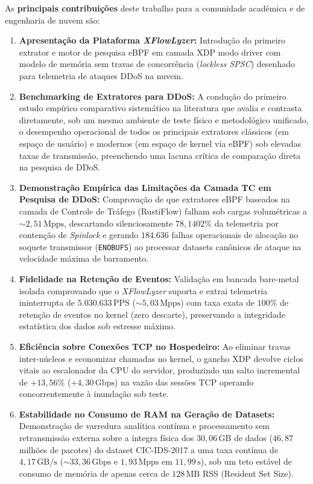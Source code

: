 \documentclass[conference]{IEEEtran}
\newcommand{\nome}{\textit{XFlowLyzer}\xspace}
\begin{document}
As \textbf{principais contribuições} deste trabalho para a comunidade acadêmica e de engenharia de nuvem são:
\begin{enumerate}
    \item \textbf{Apresentação da Plataforma \nome:} Introdução do primeiro extrator e motor de pesquisa eBPF em camada XDP modo driver com modelo de memória sem travas de concorrência (\textit{lockless SPSC}) desenhado para telemetria de ataques DDoS na nuvem.
    \item \textbf{Benchmarking de Extratores para DDoS:} A condução do primeiro estudo empírico comparativo sistemático na literatura que avalia e contrasta diretamente, sob um mesmo ambiente de teste físico e metodológico unificado, o desempenho operacional de todos os principais extratores clássicos (em espaço de usuário) e modernos (em espaço de kernel via eBPF) sob elevadas taxas de transmissão, preenchendo uma lacuna crítica de comparação direta na pesquisa de DDoS.
    \item \textbf{Demonstração Empírica das Limitações da Camada TC em Pesquisa de DDoS:} Comprovação de que extratores eBPF baseados na camada de Controle de Tráfego (RustiFlow) falham sob cargas volumétricas a $\sim 2,51\,\text{Mpps}$, descartando silenciosamente $78,1402\%$ da telemetria por contenção de \textit{Spinlock} e gerando $184.636$ falhas operacionais de alocação no soquete transmissor (\texttt{ENOBUFS}) ao processar datasets canônicos de ataque na velocidade máxima de barramento.
    \item \textbf{Fidelidade na Retenção de Eventos:} Validação em bancada bare-metal isolada comprovando que o \nome suporta e extrai telemetria ininterrupta de $5.030.633\,\text{PPS}$ ($\sim 5,03\,\text{Mpps}$) com taxa exata de $100\%$ de retenção de eventos no kernel (zero descarte), preservando a integridade estatística dos dados sob estresse máximo.
    \item \textbf{Eficiência sobre Conexões TCP no Hospedeiro:} Ao eliminar travas inter-núcleos e economizar chamadas no kernel, o gancho XDP devolve ciclos vitais ao escalonador da CPU do servidor, produzindo um salto incremental de $+13,56\%$ ($+4,30\,\text{Gbps}$) na vazão das sessões TCP operando concorrentemente à inundação sob teste.
    \item \textbf{Estabilidade no Consumo de RAM na Geração de Datasets:} Demonstração de varredura analítica contínua e processamento sem retransmissão externa sobre a íntegra física dos $30,06\,\text{GB}$ de dados ($46,87$ milhões de pacotes) do dataset CIC-IDS-2017 a uma taxa contínua de $4,17\,\text{GB/s}$ ($\sim 33,36\,\text{Gbps}$ e $1,93\,\text{Mpps}$ em $11,99\,\text{s}$), sob um teto estável de consumo de memória de apenas cerca de $128\,\text{MB}$ RSS (Resident Set Size).
\end{enumerate}
\end{document}
